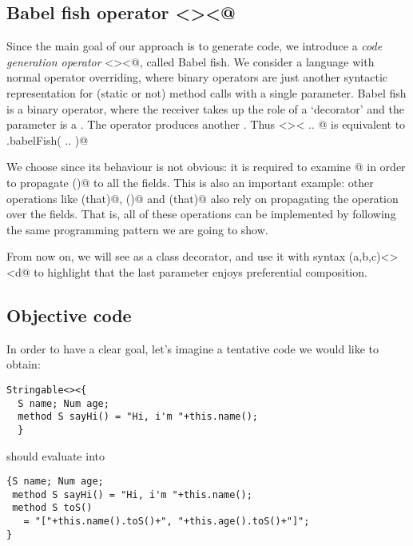 \subsection*{Babel fish operator \Q@<><@}
Since the main goal of our approach is to generate code, we introduce a \emph{code generation operator} \Q@<><@, called Babel fish.
We consider a language with normal operator overriding, where binary operators are just another syntactic representation for (static or not) method calls with a single parameter.
Babel fish is a binary operator, where the receiver takes up the role
of a `decorator' and the parameter is a \Q@Library@. The operator produces another \Q@Library@.
Thus \Q@Stringable <>< { .. }@ is equivalent to \Q@Stringable.babelFish({ .. })@ 




We choose \Q@Stringable@ since its behaviour is not obvious: it is required to examine @ in order to 
propagate \Q@toS()@ to all the fields.
This is also an important example: other operations like \Q@equals(that)@, \Q@hashCode()@ and \Q@compare(that)@
also rely on propagating the operation over the fields.
That is, all of these operations can be implemented by
following the same programming pattern we are going to show.

From now on, we will see \Q@Override@ as a class decorator, and
use it with syntax \Q@Override(a,b,c)<><d@ to highlight that the last parameter enjoys preferential composition.

\subsection*{Objective code}
In order to have a clear goal,
let's imagine a tentative code we would like to obtain:

\saveSpace
\begin{lstlisting}
Stringable<><{
  S name; Num age;
  method S sayHi() = "Hi, i'm "+this.name();
  }
\end{lstlisting}
\saveSpace

\noindent should evaluate into

\saveSpace
\begin{lstlisting}
{S name; Num age;
 method S sayHi() = "Hi, i'm "+this.name();
 method S toS() 
   = "["+this.name().toS()+", "+this.age().toS()+"]";
}
\end{lstlisting}
\saveSpace


